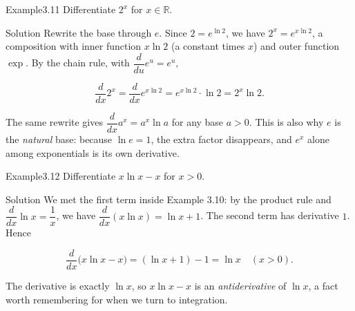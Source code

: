 \documentclass[a4paper,12pt,oneside]{memoir}
\begin{document}
\begin{workedexample}
\begin{envexample}{Example}{3.11}{}
Differentiate \(2^{x}\) for \(x \in \mathbb{R}\).
\end{envexample}
\begin{envsolution}{Solution}{}{}
Rewrite the base through \(e\). Since \(2 = e^{\ln 2}\), we have \(2^{x} = e^{x\ln 2}\), a composition with inner function \(x\ln 2\) (a constant times \(x\)) and outer function \(\exp\). By the chain rule, with \(\dfrac{d}{du}e^{u} = e^{u}\),

\[ \frac{d}{dx}2^{x} = \frac{d}{dx}e^{x\ln 2} = e^{x\ln 2}\cdot\ln 2 = 2^{x}\ln 2. \]

The same rewrite gives \(\dfrac{d}{dx}a^{x} = a^{x}\ln a\) for any base \(a > 0\). This is also why \(e\) is the \emph{natural} base: because \(\ln e = 1\), the extra factor disappears, and \(e^{x}\) alone among exponentials is its own derivative.
\end{envsolution}
\end{workedexample}
\begin{workedexample}
\begin{envexample}{Example}{3.12}{}
Differentiate \(x\ln x - x\) for \(x > 0\).
\end{envexample}
\begin{envsolution}{Solution}{}{}
We met the first term inside Example 3.10: by the product rule and \(\dfrac{d}{dx}\ln x = \dfrac{1}{x}\), we have \(\dfrac{d}{dx}(x\ln x) = \ln x + 1\). The second term has derivative \(1\). Hence

\[ \frac{d}{dx}\bigl(x\ln x - x\bigr) = (\ln x + 1) - 1 = \ln x \quad (x > 0). \]

The derivative is exactly \(\ln x\), so \(x\ln x - x\) is an \emph{antiderivative} of \(\ln x\), a fact worth remembering for when we turn to integration.
\end{envsolution}
\end{workedexample}
\end{document}
